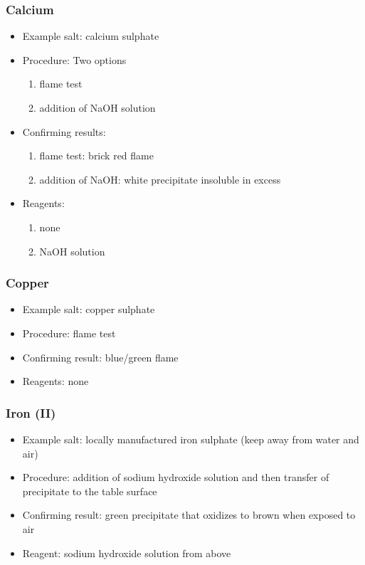 \subsubsection{Calcium}
\begin{itemize}
\item{Example salt: calcium sulphate}

\item{Procedure: Two options
\begin{enumerate}
\item{flame test}
\item{addition of NaOH solution}
\end{enumerate}
} %

\item{Confirming results:
\begin{enumerate}
\item{flame test: brick red flame}
\item{addition of NaOH: white precipitate insoluble in excess}
\end{enumerate}
} %

\item{Reagents:
\begin{enumerate}
\item{none}
\item{NaOH solution}
\end{enumerate}
} %

\end{itemize} %

\subsubsection{Copper}
\begin{itemize}
\item{Example salt: copper sulphate}
\item{Procedure: flame test}
\item{Confirming result: blue/green flame}
\item{Reagents: none}
\end{itemize}

\subsubsection{Iron (II)}
\begin{itemize}
\item{Example salt: locally manufactured iron sulphate 
(keep away from water and air)}
\item{Procedure: addition of sodium hydroxide solution 
and then transfer of precipitate to the table surface}
\item{Confirming result: green precipitate 
that oxidizes to brown when exposed to air}
\item{Reagent: sodium hydroxide solution from above}
\end{itemize}

